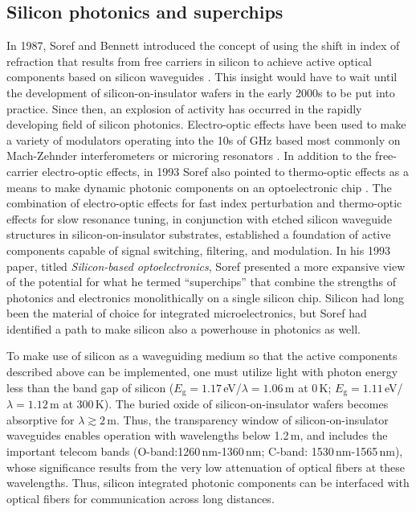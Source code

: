\documentclass[twocolumn]{article}
\begin{document}
\subsection{Silicon photonics and superchips}
In 1987, Soref and Bennett introduced the concept of using the shift in index of refraction that results from free carriers in silicon to achieve active optical components based on silicon waveguides \cite{sobe1987}. This insight would have to wait until the development of silicon-on-insulator wafers in the early 2000s to be put into practice. Since then, an explosion of activity has occurred in the rapidly developing field of silicon photonics. Electro-optic effects have been used to make a variety of modulators \cite{rema2010} operating into the 10s of GHz based most commonly on Mach-Zehnder interferometers \cite{lisa2005} or microring resonators \cite{xuma2007}. In addition to the free-carrier electro-optic effects, in 1993 Soref also pointed to thermo-optic effects as a means to make dynamic photonic components on an optoelectronic chip \cite{so1993}. The combination of electro-optic effects for fast index perturbation and thermo-optic effects for slow resonance tuning, in conjunction with etched silicon waveguide structures in silicon-on-insulator substrates, established a foundation of active components capable of signal switching, filtering, and modulation. In his 1993 paper, titled \textit{Silicon-based optoelectronics}, Soref presented a more expansive view of the potential for what he termed ``superchips'' that combine the strengths of photonics and electronics monolithically on a single silicon chip. Silicon had long been the material of choice for integrated microelectronics, but Soref had identified a path to make silicon also a powerhouse in photonics as well.

To make use of silicon as a waveguiding medium so that the active components described above can be implemented, one must utilize light with photon energy less than the band gap of silicon ($E_{\mathrm{g}}=1.17$\,eV/$\lambda = 1.06$\,\textmu m at 0\,K; $E_{\mathrm{g}}=1.11$\,eV/$\lambda = 1.12$\,\textmu m at 300\,K). The buried oxide of silicon-on-insulator wafers becomes absorptive for $\lambda \gtrsim 2$\,\textmu m. Thus, the transparency window of silicon-on-insulator waveguides enables operation with wavelengths below 1.2\,\textmu m, and includes the important telecom bands (O-band:1260\,nm-1360\,nm; C-band: 1530\,nm-1565\,nm), whose significance results from the very low attenuation of optical fibers at these wavelengths. Thus, silicon integrated photonic components can be interfaced with optical fibers for communication across long distances. 
\end{document}
